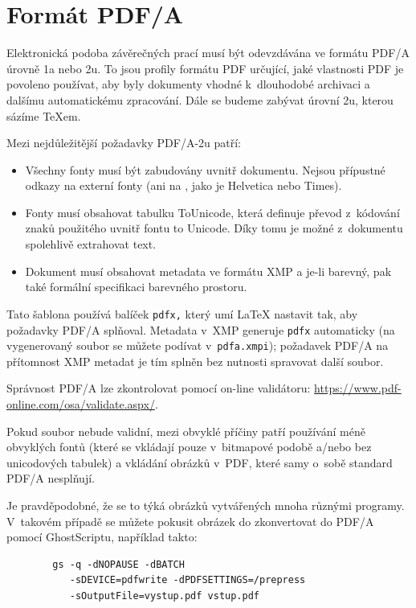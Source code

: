 
\chapter{Formát PDF/A}\label{kap:pdfa}

Elektronická podoba závěrečných
prací musí být odevzdávána ve formátu PDF/A úrovně 1a nebo 2u. To jsou
profily formátu PDF určující, jaké vlastnosti PDF je povoleno používat,
aby byly dokumenty vhodné k~dlouhodobé archivaci a dalšímu automatickému
zpracování. Dále se budeme zabývat úrovní 2u, kterou sázíme \TeX{}em.

Mezi nejdůležitější požadavky PDF/A-2u patří:

\begin{itemize}

\item Všechny fonty musí být zabudovány uvnitř dokumentu. Nejsou přípustné
odkazy na externí fonty (ani na , jako je Helvetica nebo Times).

\item Fonty musí obsahovat tabulku ToUnicode, která definuje převod z~kódování
znaků použitého uvnitř fontu to Unicode. Díky tomu je možné z~dokumentu
spolehlivě extrahovat text.

\item Dokument musí obsahovat metadata ve formátu XMP a je-li barevný,
pak také formální specifikaci barevného prostoru.

\end{itemize}

Tato šablona používá balíček {\tt pdfx,} který umí \LaTeX{} nastavit tak,
aby požadavky PDF/A splňoval. Metadata v~XMP generuje {\tt pdfx} automaticky
(na vygenerovaný soubor se můžete podívat v~{\tt pdfa.xmpi}); požadavek
PDF/A na přítomnost XMP metadat je tím splněn bez nutnosti spravovat
další soubor.

Správnost PDF/A lze zkontrolovat pomocí on-line validátoru: \url{https://www.pdf-online.com/osa/validate.aspx/}.

Pokud soubor nebude validní, mezi obvyklé příčiny patří používání méně
obvyklých fontů (které se vkládají pouze v~bitmapové podobě a/nebo bez
unicodových tabulek) a vkládání obrázků v~PDF, které samy o~sobě standard
PDF/A nesplňují.

Je pravděpodobné, že se to týká obrázků vytvářených mnoha různými programy.
V~takovém případě se můžete pokusit obrázek do zkonvertovat do PDF/A pomocí
GhostScriptu, například takto:

\begin{verbatim}
        gs -q -dNOPAUSE -dBATCH
           -sDEVICE=pdfwrite -dPDFSETTINGS=/prepress
           -sOutputFile=vystup.pdf vstup.pdf
\end{verbatim}
